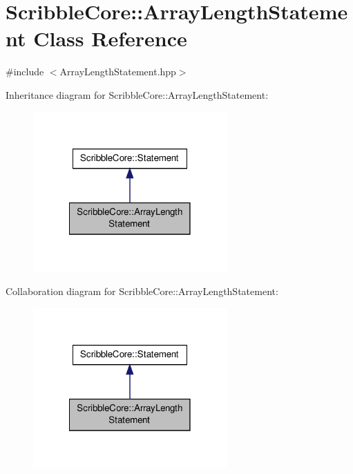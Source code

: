 \hypertarget{class_scribble_core_1_1_array_length_statement}{\section{Scribble\-Core\-:\-:Array\-Length\-Statement Class Reference}
\label{class_scribble_core_1_1_array_length_statement}
}


{\ttfamily \#include $<$Array\-Length\-Statement.\-hpp$>$}



Inheritance diagram for Scribble\-Core\-:\-:Array\-Length\-Statement\-:
\nopagebreak
\begin{figure}[H]
\begin{center}
\leavevmode
\includegraphics[width=210pt]{class_scribble_core_1_1_array_length_statement__inherit__graph}
\end{center}
\end{figure}


Collaboration diagram for Scribble\-Core\-:\-:Array\-Length\-Statement\-:
\nopagebreak
\begin{figure}[H]
\begin{center}
\leavevmode
\includegraphics[width=210pt]{class_scribble_core_1_1_array_length_statement__coll__graph}
\end{center}
\end{figure}
